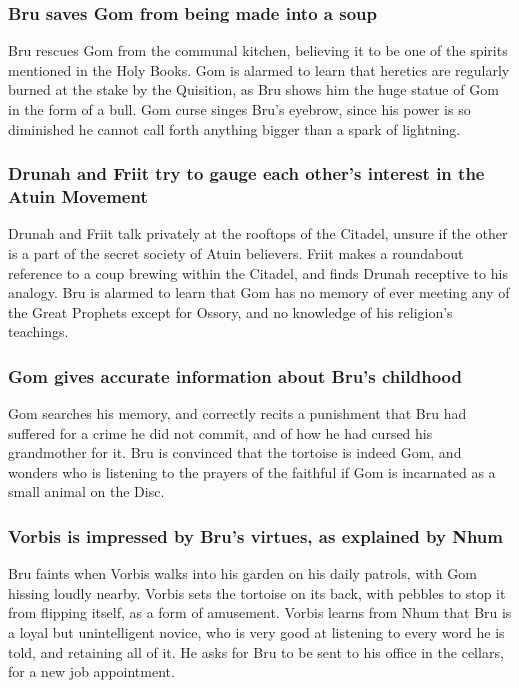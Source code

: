 \subsubsection{\Gls{Bru} saves \Gls{Gom} from being made into a soup}
\Gls{Bru} rescues \Gls{Gom} from the communal kitchen, believing it to be one of the spirits
mentioned in the Holy Books. \Gls{Gom} is alarmed to learn that heretics are regularly burned at
the stake by the Quisition, as \Gls{Bru} shows him the huge statue of \Gls{Gom} in the form of a
bull. \Gls{Gom} curse singes \Gls{Bru}'s eyebrow, since his power is so diminished he cannot call
forth anything bigger than a spark of lightning.

\subsubsection{\Gls{Drunah} and \Gls{Friit} try to gauge each other's interest in the \Gls{Atuin}
    Movement}
\Gls{Drunah} and \Gls{Friit} talk privately at the rooftops of the Citadel, unsure if the other is a
part of the secret society of \Gls{Atuin} believers. \Gls{Friit} makes a roundabout reference to
a coup brewing within the Citadel, and finds \Gls{Drunah} receptive to his analogy. \Gls{Bru} is
alarmed to learn that \Gls{Gom} has no memory of ever meeting any of the Great Prophets except for
\Gls{Ossory}, and no knowledge of his religion's teachings.

\subsubsection{\Gls{Gom} gives accurate information about \Gls{Bru}'s childhood}
\Gls{Gom} searches his memory, and correctly recits a punishment that \Gls{Bru} had suffered for a
crime he did not commit, and of how he had cursed his grandmother for it. \Gls{Bru} is convinced
that the tortoise is indeed \Gls{Gom}, and wonders who is listening to the prayers of the faithful
if \Gls{Gom} is incarnated as a small animal on the Disc.

\subsubsection{\Gls{Vorbis} is impressed by \Gls{Bru}'s virtues, as explained by \Gls{Nhum}}
\Gls{Bru} faints when \Gls{Vorbis} walks into his garden on his daily patrols, with \Gls{Gom}
hissing loudly nearby. \Gls{Vorbis} sets the tortoise on its back, with pebbles to stop it from
flipping itself, as a form of amusement. \Gls{Vorbis} learns from \Gls{Nhum} that \Gls{Bru} is a
loyal but unintelligent novice, who is very good at listening to every word he is told, and
retaining all of it. He asks for \Gls{Bru} to be sent to his office in the cellars, for a new
job appointment.

